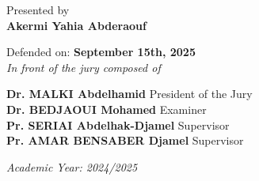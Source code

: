 \begin{titlepage}
\normalsize Presented by\\
{\normalsize \textbf{Akermi Yahia Abderaouf}}\\

\vspace{0.2cm}

{\normalsize Defended on: \textbf{September 15th, 2025}}\\
{\normalsize \textit{In front of the jury composed of}}\\

\vspace{0.2cm}

\begin{center}
    {\normalsize \textbf{Dr.  MALKI Abdelhamid} \hfill President of the Jury}\\
    {\normalsize \textbf{Dr.   BEDJAOUI Mohamed} \hfill Examiner}\\
    {\normalsize \textbf{Pr.  SERIAI Abdelhak-Djamel} \hfill Supervisor}\\
    {\normalsize \textbf{Pr.  AMAR BENSABER Djamel} \hfill Supervisor}\\
\end{center}

\vspace{0.5cm}

\normalsize \textit{Academic Year: 2024/2025}
\end{titlepage}
